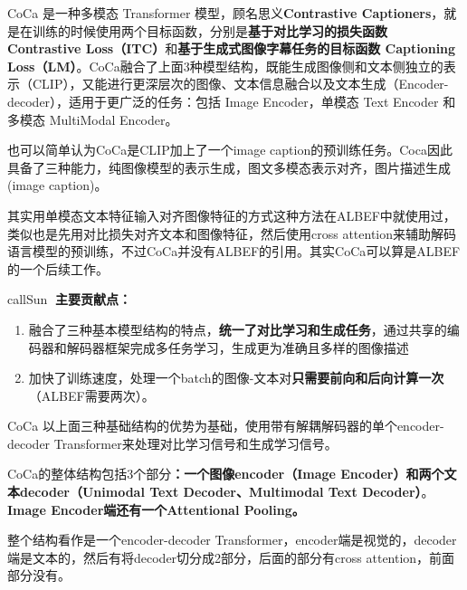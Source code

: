 \documentclass[zihao=false,fontset=windows]{ctexart}
\begin{document}
\par\vspace{1.15em}\par\vspace{0.28em}
CoCa 是一种多模态 Transformer 模型，顾名思义\textcolor{feishuRed}{\textbf{Contrastive Captioners}}，就是在训练的时候使用两个目标函数，分别是\textbf{基于对比学习的损失函数 Contrastive Loss（ITC）}和\textbf{基于生成式图像字幕任务的目标函数 Captioning Loss（LM）}。CoCa融合了上面3种模型结构，既能生成图像侧和文本侧独立的表示（CLIP），又能进行更深层次的图像、文本信息融合以及文本生成（Encoder-decoder），适用于更广泛的任务：包括 Image Encoder，单模态 Text Encoder 和多模态 MultiModal Encoder。\par
也可以简单认为CoCa是CLIP加上了一个image caption的预训练任务。Coca因此具备了三种能力，纯图像模型的表示生成，图文多模态表示对齐，图片描述生成(image caption)。\par
其实\textcolor{feishuBlue}{用单模态文本特征输入对齐图像特征的方式这种方法}在ALBEF中就使用过，类似也是先用对比损失对齐文本和图像特征，然后使用cross attention来辅助解码语言模型的预训练，不过CoCa并没有ALBEF的引用。其实CoCa可以算是ALBEF的一个后续工作。\par

\begin{feishubox}{callSun}{🌟}
\textcolor{feishuRed}{\textbf{主要贡献点：}}\par
\begin{enumerate}
\item 融合了三种基本模型结构的特点，\textbf{统一了对比学习和生成任务}，通过共享的编码器和解码器框架完成多任务学习，生成更为准确且多样的图像描述
\item 加快了训练速度，处理一个batch的图像-文本对\textbf{只需要前向和后向计算一次}（ALBEF需要两次）。
\end{enumerate}
\end{feishubox}

\par\vspace{1.15em}\par\vspace{0.28em}
CoCa 以上面三种基础结构的优势为基础，使用带有解耦解码器的单个encoder-decoder Transformer来处理对比学习信号和生成学习信号。\par
CoCa的整体结构包括3个部分\textbf{：一个图像encoder（Image Encoder）和两个文本decoder（Unimodal Text Decoder、Multimodal Text Decoder）}。\textbf{Image Encoder端还有一个Attentional Pooling。}\par
\begin{feishuquote}
整个结构看作是一个encoder-decoder Transformer，encoder端是视觉的，decoder端是文本的，然后有将decoder切分成2部分，后面的部分有cross attention，前面部分没有。\par
\end{feishuquote}
\end{document}
